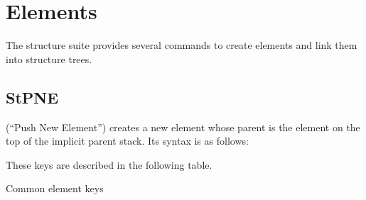 \documentclass[letterpaper,12pt,english,openany,oneside]{sphinxmanual}
\begin{document}
\section{Elements}
\label{\detokenize{pdfmark_Logical:elements}}
The structure suite provides several commands to create elements and link them into structure trees.


\subsection{StPNE}
\label{\detokenize{pdfmark_Logical:stpne}}
 (“Push New Element”) creates a new element whose parent is the element on the top of the implicit parent stack. Its syntax is as follows:

\begin{sphinxVerbatim}[commandchars=\\\{\}]
 \PYG{p}{[} 
\PYG{p}{[} 
         
\PYG{p}{[}            
\PYG{p}{[} 
\PYG{p}{[} 
\PYG{p}{[} 
\PYG{p}{[} 
\PYG{p}{[} 
\PYG{p}{[} 
         
\end{sphinxVerbatim}

These keys are described in the following table.

Common element keys
\end{document}
